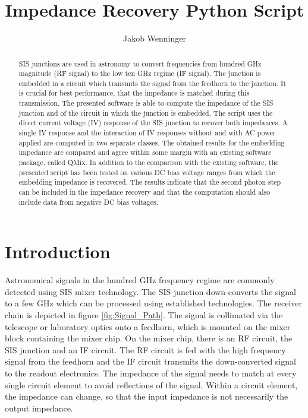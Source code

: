 \documentclass[]{article}
\title{Impedance Recovery Python Script}
\author{Jakob Wenninger}
\begin{document}
	
	\maketitle
	
	\begin{abstract}
 
SIS junctions are used in astronomy to convert frequencies from hundred GHz magnitude (RF signal) to the low ten GHz regime (IF signal). The junction is embedded in a circuit which transmits the signal from the feedhorn to the junction. It is crucial for best performance, that the impedance is matched during this transmission. The presented software is able to compute the impedance of the SIS junction and of the circuit in which the junction is embedded. The script uses the direct current voltage (IV) response of the SIS junction to recover both impedances. A single IV response and the interaction of IV responses without and with AC power applied are computed in two separate classes. The obtained results for the embedding impedance are compared and agree within some margin with an existing software package, called QMix. In addition to the comparison with the existing software, the presented script has been tested on various DC bias voltage ranges from which the embedding impedance is recovered. The results indicate that the second photon step can be included in the impedance recovery and that the computation should also include data from negative DC bias voltages.
\end{abstract}

\section{Introduction}
Astronomical signals in the hundred GHz frequency regime are commonly detected using SIS mixer technology. The SIS junction down-converts the signal to a few GHz which can be processed using established technologies. The receiver chain is depicted in figure \ref{fig:Signal_Path}. The signal is collimated via the telescope or laboratory optics onto a feedhorn, which is mounted on the mixer block containing the mixer chip. On the mixer chip, there is an RF circuit, the SIS junction and an IF circuit. The RF circuit is fed with the high frequency signal from the feedhorn and the IF circuit transmits the down-converted signal to the readout electronics. 
The impedance of the signal needs to match at every single circuit element to avoid reflections of the signal. Within a circuit element, the impedance can change, so that the input impedance is not necessarily the output impedance.
\end{document}
